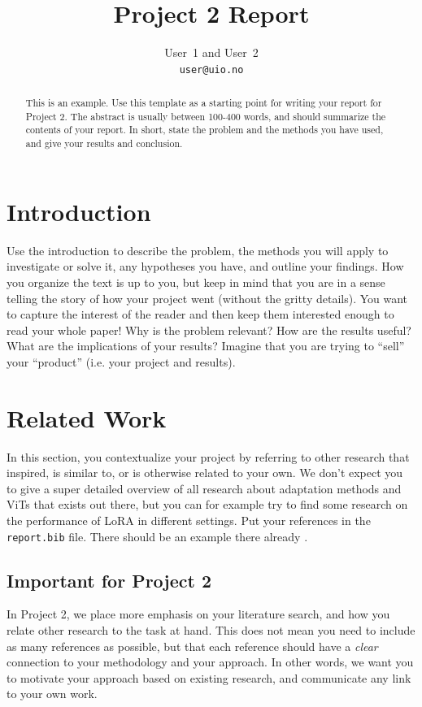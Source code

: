\documentclass[10pt]{article}
\begin{document}
\title{Project 2 Report}
\author{User~1 and User~2\\\footnotesize\texttt{user@uio.no}}
\date{}
\maketitle

\begin{abstract}
  This is an example. Use this template as a starting point for writing your report for Project 2. The abstract is usually between 100-400 words, and should summarize the contents of your report. In short, state the problem and the methods you have used, and give your results and conclusion.
\end{abstract}

\section{Introduction}
Use the introduction to describe the problem, the methods you will apply to investigate or solve it, any hypotheses you have, and outline your findings.
How you organize the text is up to you, but keep in mind that you are in a sense telling the story of how your project went (without the gritty details). You want to capture the interest of the reader and then keep them interested enough to read your whole paper!
Why is the problem relevant? How are the results useful? What are the implications of your results?
Imagine that you are trying to ``sell'' your ``product'' (i.e. your project and results).

\section{Related Work}
In this section, you contextualize your project by referring to other research that inspired, is similar to, or is otherwise related to your own.
We don't expect you to give a super detailed overview of all research about adaptation methods and ViTs that exists out there, but you can for example try to find some research on the performance of LoRA in different settings.
Put your references in the \texttt{report.bib} file. There should be an example there already \cite{Test}.

\subsection{Important for Project 2}
\label{subsec:important}
In Project 2, we place more emphasis on your literature search, and how you relate other research to the task at hand. This does not mean you need to include as many references as possible, but that each reference should have a \textit{clear} connection to your methodology and your approach. In other words, we want you to motivate your approach based on existing research, and communicate any link to your own work.
\end{document}
